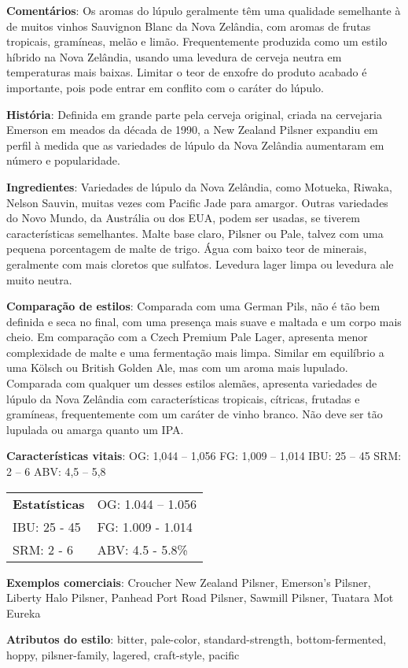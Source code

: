 \textbf{Comentários}: Os aromas do lúpulo geralmente têm uma qualidade semelhante à de muitos vinhos Sauvignon Blanc da Nova Zelândia, com aromas de frutas tropicais, gramíneas, melão e limão. Frequentemente produzida como um estilo híbrido na Nova Zelândia, usando uma levedura de cerveja neutra em temperaturas mais baixas. Limitar o teor de enxofre do produto acabado é importante, pois pode entrar em conflito com o caráter do lúpulo.

\textbf{História}: Definida em grande parte pela cerveja original, criada na cervejaria Emerson em meados da década de 1990, a New Zealand Pilsner expandiu em perfil à medida que as variedades de lúpulo da Nova Zelândia aumentaram em número e popularidade.

\textbf{Ingredientes}: Variedades de lúpulo da Nova Zelândia, como Motueka, Riwaka, Nelson Sauvin, muitas vezes com Pacific Jade para amargor. Outras variedades do Novo Mundo, da Austrália ou dos EUA, podem ser usadas, se tiverem características semelhantes. Malte base claro, Pilsner ou Pale, talvez com uma pequena porcentagem de malte de trigo. Água com baixo teor de minerais, geralmente com mais cloretos que sulfatos. Levedura lager limpa ou levedura ale muito neutra.

\textbf{Comparação de estilos}: Comparada com uma German Pils, não é tão bem definida e seca no final, com uma presença mais suave e maltada e um corpo mais cheio. Em comparação com a Czech Premium Pale Lager, apresenta menor complexidade de malte e uma fermentação mais limpa. Similar em equilíbrio a uma Kölsch ou British Golden Ale, mas com um aroma mais lupulado. Comparada com qualquer um desses estilos alemães, apresenta variedades de lúpulo da Nova Zelândia com características tropicais, cítricas, frutadas e gramíneas, frequentemente com um caráter de vinho branco. Não deve ser tão lupulada ou amarga quanto um IPA.

\textbf{Características vitais}: OG: 1,044 – 1,056
FG: 1,009 – 1,014
IBU: 25 – 45
SRM: 2 – 6
ABV: 4,5 – 5,8%

\begin{tabular}{@{}p{35mm}p{35mm}@{}}
  \textbf{Estatísticas} & OG: 1.044 – 1.056\\
  IBU: 25 - 45 & FG: 1.009 - 1.014 \\
  SRM: 2 - 6  & ABV: 4.5 - 5.8\%
\end{tabular}

\textbf{Exemplos comerciais}: Croucher New Zealand Pilsner, Emerson’s Pilsner, Liberty Halo Pilsner, Panhead Port Road Pilsner, Sawmill Pilsner, Tuatara Mot Eureka

\textbf{Atributos do estilo}: bitter, pale-color, standard-strength, bottom-fermented, hoppy, pilsner-family, lagered, craft-style, pacific
